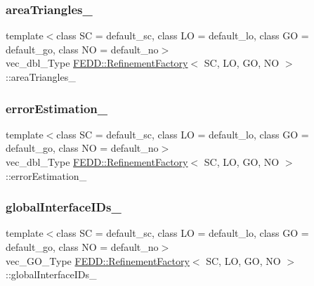 \subsubsection{\texorpdfstring{area\+Triangles\+\_\+}{areaTriangles\_}}
{\footnotesize\ttfamily template$<$class SC = default\+\_\+sc, class LO = default\+\_\+lo, class GO = default\+\_\+go, class NO = default\+\_\+no$>$ \\
vec\+\_\+dbl\+\_\+\+Type \hyperlink{classFEDD_1_1RefinementFactory}{F\+E\+D\+D\+::\+Refinement\+Factory}$<$ SC, LO, GO, NO $>$\+::area\+Triangles\+\_\+\hspace{0.3cm}{\ttfamily [protected]}}

\mbox{\label{classFEDD_1_1RefinementFactory_ae04f877455828ca9d2328b6b29a72652}} 
\subsubsection{\texorpdfstring{error\+Estimation\+\_\+}{errorEstimation\_}}
{\footnotesize\ttfamily template$<$class SC = default\+\_\+sc, class LO = default\+\_\+lo, class GO = default\+\_\+go, class NO = default\+\_\+no$>$ \\
vec\+\_\+dbl\+\_\+\+Type \hyperlink{classFEDD_1_1RefinementFactory}{F\+E\+D\+D\+::\+Refinement\+Factory}$<$ SC, LO, GO, NO $>$\+::error\+Estimation\+\_\+\hspace{0.3cm}{\ttfamily [protected]}}

\mbox{\label{classFEDD_1_1RefinementFactory_ae71ae7a6d0586a37cdc2aadfafeb00c4}} 
\subsubsection{\texorpdfstring{global\+Interface\+I\+Ds\+\_\+}{globalInterfaceIDs\_}}
{\footnotesize\ttfamily template$<$class SC = default\+\_\+sc, class LO = default\+\_\+lo, class GO = default\+\_\+go, class NO = default\+\_\+no$>$ \\
vec\+\_\+\+G\+O\+\_\+\+Type \hyperlink{classFEDD_1_1RefinementFactory}{F\+E\+D\+D\+::\+Refinement\+Factory}$<$ SC, LO, GO, NO $>$\+::global\+Interface\+I\+Ds\+\_\+\hspace{0.3cm}{\ttfamily [protected]}}


